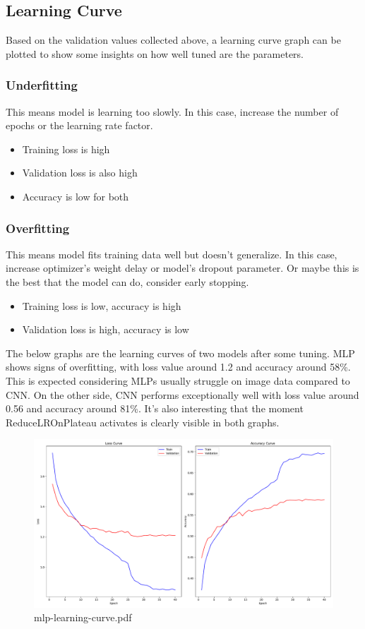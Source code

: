 \documentclass{report}
\begin{document}
\subsection{Learning Curve}
Based on the validation values collected above, a learning curve graph can be plotted to show some insights on 
how well tuned are the parameters.

\subsubsection*{Underfitting}
This means model is learning too slowly. In this case, increase the number of epochs or the learning rate factor.

\begin{itemize}
    \item Training loss is high
    \item Validation loss is also high
    \item Accuracy is low for both
\end{itemize}


\subsubsection*{Overfitting}
This means model fits training data well but doesn't generalize. In this case, increase optimizer's weight delay 
or model's dropout parameter. Or maybe this is the best that the model can do, consider early stopping.

\begin{itemize}
    \item Training loss is low, accuracy is high
    \item Validation loss is high, accuracy is low
\end{itemize}

\noindent
The below graphs are the learning curves of two models after some tuning. MLP shows signs of overfitting, with loss value 
around 1.2 and accuracy around 58\%. This is expected considering MLPs usually struggle on image data compared to CNN. 
On the other side, CNN performs exceptionally well with loss value around 0.56 and accuracy around 81\%. It's also interesting 
that the moment ReduceLROnPlateau activates is clearly visible in both graphs.

\begin{figure}[ht!]
    \center 
    \includegraphics[scale=0.4]{../output/mlp-learning-curve.pdf}
    \caption{mlp-learning-curve.pdf}
\end{figure}
\end{document}
